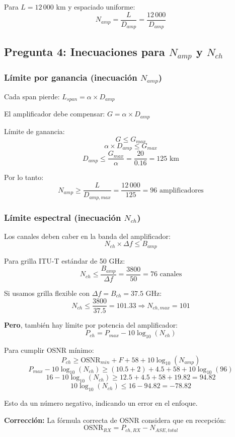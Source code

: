 \documentclass[a4paper,10pt]{article}
\begin{document}
Para $L = 12\,000$ km y espaciado uniforme:
$$N_{amp} = \frac{L}{D_{amp}} = \frac{12\,000}{D_{amp}}$$

\subsection{Pregunta 4: Inecuaciones para $N_{amp}$ y $N_{ch}$}

\subsubsection{Límite por ganancia (inecuación $N_{amp}$)}

Cada span pierde: $L_{span} = \alpha \times D_{amp}$

El amplificador debe compensar: $G = \alpha \times D_{amp}$

Límite de ganancia:
$$G \leq G_{max}$$
$$\alpha \times D_{amp} \leq G_{max}$$
$$D_{amp} \leq \frac{G_{max}}{\alpha} = \frac{20}{0.16} = 125 \text{ km}$$

Por lo tanto:
$$\boxed{N_{amp} \geq \frac{L}{D_{amp,max}} = \frac{12\,000}{125} = 96 \text{ amplificadores}}$$

\subsubsection{Límite espectral (inecuación $N_{ch}$)}

Los canales deben caber en la banda del amplificador:
$$N_{ch} \times \Delta f \leq B_{amp}$$

Para grilla ITU-T estándar de 50 GHz:
$$N_{ch} \leq \frac{B_{amp}}{\Delta f} = \frac{3800}{50} = 76 \text{ canales}$$

Si usamos grilla flexible con $\Delta f = B_{ch} = 37.5$ GHz:
$$N_{ch} \leq \frac{3800}{37.5} = 101.33 \Rightarrow N_{ch,max} = 101$$

\textbf{Pero}, también hay límite por potencia del amplificador:
$$P_{ch} = P_{max} - 10\log_{10}(N_{ch})$$

Para cumplir OSNR mínimo:
$$P_{ch} \geq \text{OSNR}_{min} + F + 58 + 10\log_{10}(N_{amp})$$
$$P_{max} - 10\log_{10}(N_{ch}) \geq (10.5 + 2) + 4.5 + 58 + 10\log_{10}(96)$$
$$16 - 10\log_{10}(N_{ch}) \geq 12.5 + 4.5 + 58 + 19.82 = 94.82$$
$$10\log_{10}(N_{ch}) \leq 16 - 94.82 = -78.82$$

Esto da un número negativo, indicando un error en el enfoque.

\textbf{Corrección:} La fórmula correcta de OSNR considera que en recepción:
$$\text{OSNR}_{RX} = P_{ch,RX} - N_{ASE,total}$$
\end{document}
